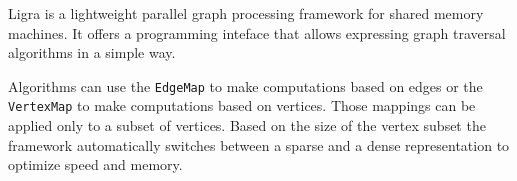 
Ligra\cite{Ligra} is a lightweight parallel graph processing framework for shared memory machines. It offers a programming inteface that allows expressing graph traversal algorithms in a simple way.

Algorithms can use the \texttt{EdgeMap} to make computations based on edges or the \texttt{VertexMap} to make computations based on vertices. Those mappings can be applied only to a subset of vertices. Based on the size of the vertex subset the framework automatically switches between a sparse and a dense representation to optimize speed and memory.

